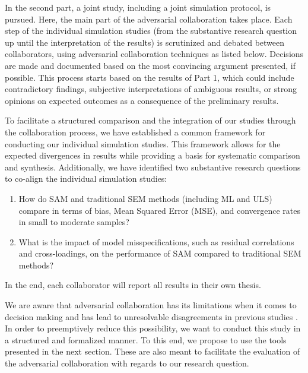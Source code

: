 \documentclass[man]{apa7}
\begin{document}
In the second part, a joint study, including a joint simulation protocol, is pursued. Here, the main part of the adversarial collaboration takes place. Each step of the individual simulation studies (from the substantive research question up until the interpretation of the results) is scrutinized and debated between collaborators, using adversarial collaboration techniques as listed below. Decisions are made and documented based on the most convincing argument presented, if possible. This process starts based on the results of Part 1, which could include contradictory findings, subjective interpretations of ambiguous results, or strong opinions on expected outcomes as a consequence of the preliminary results.

To facilitate a structured comparison and the integration of our studies through the collaboration process, we have established a common framework for conducting our individual simulation studies. This framework allows for the expected divergences in results while providing a basis for systematic comparison and synthesis. Additionally, we have identified two substantive research questions to co-align the individual simulation studies:
\begin{enumerate}
\item How do SAM and traditional SEM methods (including ML and ULS) compare in terms of bias, Mean Squared Error (MSE), and convergence rates in small to moderate samples?
\item What is the impact of model misspecifications, such as residual correlations and cross-loadings, on the performance of SAM compared to traditional SEM methods?
\end{enumerate}
In the end, each collaborator will report all results in their own thesis.

We are aware that adversarial collaboration has its limitations when it comes to decision making and has lead to unresolvable disagreements in previous studies \textcite{mellers_frequency_2001, cowan_how_2020}. In order to preemptively reduce this possibility, we want to conduct this study in a structured and formalized manner. To this end, we propose to use the tools presented in the next section. These are also meant to facilitate the evaluation of the adversarial collaboration with regards to our research question.
\end{document}
